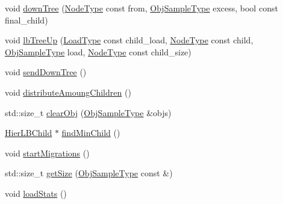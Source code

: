 \begin{DoxyCompactItemize}
\item 
void \hyperlink{structvt_1_1vrt_1_1collection_1_1lb_1_1_hierarchical_l_b_a1e7609043ea2b9830c8dd08ee0c38aa1}{down\+Tree} (\hyperlink{namespacevt_a866da9d0efc19c0a1ce79e9e492f47e2}{Node\+Type} const from, \hyperlink{structvt_1_1vrt_1_1collection_1_1lb_1_1_base_l_b_a331d7da5bbf2883238427d86b54ddd7b}{Obj\+Sample\+Type} excess, bool const final\+\_\+child)
\item 
void \hyperlink{structvt_1_1vrt_1_1collection_1_1lb_1_1_hierarchical_l_b_a6f030d878c37c7dbca04f71304319930}{lb\+Tree\+Up} (\hyperlink{structvt_1_1vrt_1_1collection_1_1lb_1_1_base_l_b_a215e22b9f12678303f49615ae3be05cc}{Load\+Type} const child\+\_\+load, \hyperlink{namespacevt_a866da9d0efc19c0a1ce79e9e492f47e2}{Node\+Type} const child, \hyperlink{structvt_1_1vrt_1_1collection_1_1lb_1_1_base_l_b_a331d7da5bbf2883238427d86b54ddd7b}{Obj\+Sample\+Type} load, \hyperlink{namespacevt_a866da9d0efc19c0a1ce79e9e492f47e2}{Node\+Type} const child\+\_\+size)
\item 
void \hyperlink{structvt_1_1vrt_1_1collection_1_1lb_1_1_hierarchical_l_b_a1b7abcf40a8dfb63e9a2ee0842af413b}{send\+Down\+Tree} ()
\item 
void \hyperlink{structvt_1_1vrt_1_1collection_1_1lb_1_1_hierarchical_l_b_a4c944c21309ab6971895acfa197e91a4}{distribute\+Amoung\+Children} ()
\item 
std\+::size\+\_\+t \hyperlink{structvt_1_1vrt_1_1collection_1_1lb_1_1_hierarchical_l_b_ad5b4484cda2f200f67e925ed1d3e1ba9}{clear\+Obj} (\hyperlink{structvt_1_1vrt_1_1collection_1_1lb_1_1_base_l_b_a331d7da5bbf2883238427d86b54ddd7b}{Obj\+Sample\+Type} \&objs)
\item 
\hyperlink{structvt_1_1vrt_1_1collection_1_1lb_1_1_hier_l_b_child}{Hier\+L\+B\+Child} $\ast$ \hyperlink{structvt_1_1vrt_1_1collection_1_1lb_1_1_hierarchical_l_b_a4064a53d865ffe55ba520f0c75e9018d}{find\+Min\+Child} ()
\item 
void \hyperlink{structvt_1_1vrt_1_1collection_1_1lb_1_1_hierarchical_l_b_a0fa467216218289dba2de1c4f88b655e}{start\+Migrations} ()
\item 
std\+::size\+\_\+t \hyperlink{structvt_1_1vrt_1_1collection_1_1lb_1_1_hierarchical_l_b_ab895082b639e196f5a128785c7b9bdda}{get\+Size} (\hyperlink{structvt_1_1vrt_1_1collection_1_1lb_1_1_base_l_b_a331d7da5bbf2883238427d86b54ddd7b}{Obj\+Sample\+Type} const \&)
\item 
void \hyperlink{structvt_1_1vrt_1_1collection_1_1lb_1_1_hierarchical_l_b_a60a953c331b4a25cbe2b6f7b6d93bbb7}{load\+Stats} ()
\end{DoxyCompactItemize}
